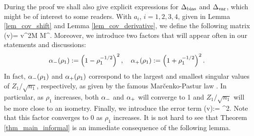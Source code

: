During the proof we shall also give explicit expressions for $\Delta_{\text{bias}}$ and $\Delta_{\text{var}}$, which might be of interest to some readers.
With $a_i$, $i=1,2,3,4$, given in Lemma \ref{lem_cov_shift} and Lemma \ref{lem_cov_derivative}, 
we define the following matrix
\be\label{defnpihat}\Pi \equiv \Pi(\hat v)= \cdot \hat v^2{M}  {M}^{\top}.\ee
Moreover, we introduce two factors that will appear often in our statements and discussions:
$$\alpha_-(\rho_1):=\left(1- \rho_1^{-1/2}\right)^2,\quad \alpha_+(\rho_1):=\left(1 + \rho_1^{-1/2}\right)^2.$$ 
In fact, $\alpha_-(\rho_1)$ and $\alpha_+(\rho_1)$ correspond to the largest and smallest singular values of $Z_1/\sqrt{n_1}$, respectively, as given by the famous Mar{\v c}enko-Pastur law \cite{MP}. In particular, as $\rho_1$ increases, both $\alpha_-$ and $\alpha_+$ will converge to 1 and $Z_1/\sqrt{n_1}$ will be more close to an isometry. Finally, we introduce the error term  
\be\label{eq_deltaextra} 
 \delta(\hat v):= \cdot  {}^2.\ee
Note that this factor converges to 0 as $\rho_1$ increases. It is not hard to see that Theorem \ref{thm_main_informal} is an immediate consequence of the following lemma.






